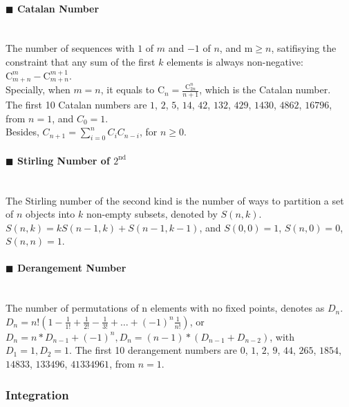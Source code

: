 \documentclass[10pt]{article}
\begin{document}
{\paragraph{$\blacksquare$ Catalan Number}
\noindent \\
The number of sequences with $1$ of $m$ and $-1$ of $n$, and m$\ge n$, satifisying the constraint that any sum of the first $k$ elements is always non-negative: $\mathrm{C}_{m+n}^{m}-\mathrm{C}_{m+n}^{m+1}$. \\
Specially, when $m=n$, it equals to $\mathrm{C}_{n}=\frac{\mathrm{C}_{2n}^{n}}{n+1}$, which is the Catalan number. \\
The first 10 Catalan numbers are $1$, $2$, $5$, $14$, $42$, $132$, $429$, $1430$, $4862$, $16796$, from $n=1$, and $C_0=1$. \\
Besides, $C_{n+1}=\sum_{i=0}^{n}C_{i}C_{n-i}$, for $n\ge 0$.
\paragraph{$\blacksquare$ Stirling Number of $\mathrm{2^{nd}}$}
\noindent \\
The Stirling number of the second kind is the number of ways to partition a set of $n$ objects into $k$ non-empty subsets, denoted by $S(n,k)$. \\
$S(n,k)=kS(n-1,k)+S(n-1,k-1)$, and $S(0,0)=1$, $S(n,0)=0$, $S(n,n)=1$.
\paragraph{$\blacksquare$ Derangement Number}
\noindent \\
The number of permutations of n elements with no fixed points, denotes as $D_n$. \\
$D_n=n!(1-\frac{1}{1!}+\frac{1}{2!}-\frac{1}{3!}+\ldots +{(-1)}^n\frac{1}{n!})$, or $D_n=n*D_{n-1}+{(-1)}^n,D_n=(n-1)*(D_{n-1}+D_{n-2})$, with $D_1=1,D_2=1$.
The first 10 derangement numbers are $0$, $1$, $2$, $9$, $44$, $265$, $1854$, $14833$, $133496$, $41334961$, from $n=1$.
\subsubsection{Integration}

}
\end{document}
